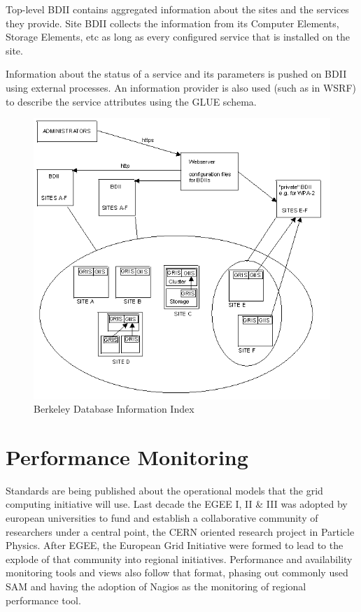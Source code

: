 Top-level BDII contains aggregated information about the sites and the services
they provide. Site BDII collects the information from its Computer Elements,
Storage Elements, etc as long as every configured service that is installed
on the site.

Information about the status of a service and its parameters is pushed on BDII
using external processes. An information provider is also used (such as in WSRF)
to describe the service attributes using the GLUE schema.

\begin{figure}[htb]
\centering
 \includegraphics[width=5in]{images/bdii.png}
\caption{Berkeley Database Information Index}
\label{figure:bdii}
\end{figure}

\section{Performance Monitoring}
Standards are being published about the operational models that the grid
computing initiative will use. Last decade the EGEE I, II \& III was adopted by
european universities to fund and establish a collaborative community of
researchers under a central point, the CERN oriented research project in
Particle Physics. After EGEE, the European Grid Initiative were formed to lead
to the explode of that community into regional initiatives. Performance
and availability monitoring tools and views also follow that format, phasing out
commonly used SAM \cite{egee3dsa122} and having the adoption of Nagios as the
monitoring of regional performance tool.


